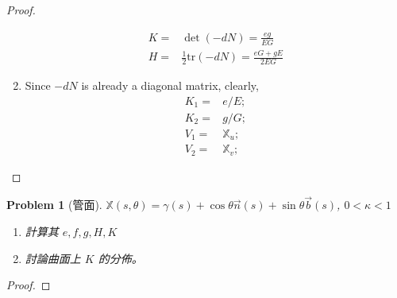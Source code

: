 \documentclass[10pt,a4paper]{article}
\newcounter{theProblemCounter}
\newtheorem{problem}[theProblemCounter]{Problem}
\begin{document}
\begin{proof}
\begin{enumerate}
\begin{align*}
K =& \det(-dN) = \frac{eg}{EG} \\
H =& \frac 12\text{tr}(-dN) = \frac{eG + gE}{2EG}
\end{align*}
\item[(b)]
Since $-dN$ is already a diagonal matrix, clearly, \begin{align*}
K_1 =& e/E; \\
K_2 =& g/G; \\
V_1 =& \mathbb{X}_u; \\
V_2 =& \mathbb{X}_v;
\end{align*}
\end{enumerate}
\end{proof}

\setcounter{theProblemCounter}{9}
\begin{problem}[管面]
$\mathbb{X}(s,\theta) = \gamma(s)+\cos\theta\vec{n}(s) + \sin\theta\vec{b}(s)$, $0<\kappa < 1$
\begin{enumerate}
\item[(a)] 計算其 $e, f, g, H, K$
\item[(b)] 討論曲面上 $K$ 的分佈。
\end{enumerate}
\end{problem}
\begin{proof}
\end{proof}
\end{document}
